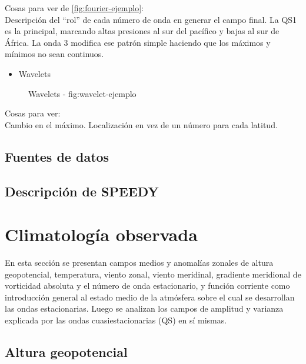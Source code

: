 \documentclass[spanish,a4paper]{book}
\providecommand{\tightlist}{%
  \setlength{\itemsep}{0pt}\setlength{\parskip}{0pt}}
\begin{document}
Cosas para ver de \autoref{fig:fourier-ejemplo}:\\
Descripción del ``rol'' de cada número de onda en generar el campo
final. La QS1 es la principal, marcando altas presiones al sur del
pacífico y bajas al sur de África. La onda 3 modifica ese patrón simple
haciendo que los máximos y mínimos no sean continuos.

\begin{itemize}
\tightlist
\item
  Wavelets
\end{itemize}

\begin{figure*}
\caption{Wavelets - fig:wavelet-ejemplo}\label{fig:wavelet-ejemplo}
\end{figure*}

Cosas para ver:\\
Cambio en el máximo. Localización en vez de un número para cada latitud.

\section{Fuentes de datos}\label{fuentes-de-datos}

\section{Descripción de SPEEDY}\label{descripcion-de-speedy}

\chapter{Climatología observada}\label{climatologia-observada}

En esta sección se presentan campos medios y anomalías zonales de altura
geopotencial, temperatura, viento zonal, viento meridinal, gradiente
meridional de vorticidad absoluta y el número de onda estacionario, y
función corriente como introducción general al estado medio de la
atmósfera sobre el cual se desarrollan las ondas estacionarias. Luego se
analizan los campos de amplitud y varianza explicada por las ondas
cuasiestacionarias (QS) en sí mismas.

\section{Altura geopotencial}\label{altura-geopotencial}
\end{document}
